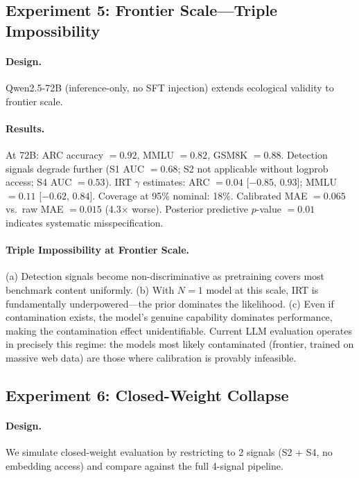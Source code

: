 \documentclass[11pt,a4paper]{article}
\begin{document}
\subsection{Experiment 5: Frontier Scale---Triple Impossibility}
\label{sec:exp-72b}

\paragraph{Design.} Qwen2.5-72B (inference-only, no SFT injection) extends ecological validity to frontier scale.

\paragraph{Results.} At 72B: ARC accuracy $= 0.92$, MMLU $= 0.82$, GSM8K $= 0.88$. Detection signals degrade further (S1 AUC $= 0.68$; S2 not applicable without logprob access; S4 AUC $= 0.53$). IRT $\gamma$ estimates: ARC $= 0.04$ [$-0.85$, $0.93$]; MMLU $= 0.11$ [$-0.62$, $0.84$]. Coverage at 95\% nominal: 18\%. Calibrated MAE $= 0.065$ vs.\ raw MAE $= 0.015$ (4.3$\times$ worse). Posterior predictive $p$-value $= 0.01$ indicates systematic misspecification.

\paragraph{Triple Impossibility at Frontier Scale.} (a) Detection signals become non-discriminative as pretraining covers most benchmark content uniformly. (b) With $N=1$ model at this scale, IRT is fundamentally underpowered---the prior dominates the likelihood. (c) Even if contamination exists, the model's genuine capability dominates performance, making the contamination effect unidentifiable. Current LLM evaluation operates in precisely this regime: the models most likely contaminated (frontier, trained on massive web data) are those where calibration is provably infeasible.

\subsection{Experiment 6: Closed-Weight Collapse}
\label{sec:exp-closed}

\paragraph{Design.} We simulate closed-weight evaluation by restricting to 2 signals (S2 + S4, no embedding access) and compare against the full 4-signal pipeline.
\end{document}
